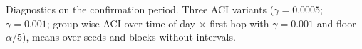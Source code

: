 \begin{table}[!htbp]
\centering
\caption{Diagnostics on the confirmation period. Three ACI variants ($\gamma=0.0005$; $\gamma=0.001$; group-wise ACI over time of
day $\times$ first hop with $\gamma=0.001$ and floor $\alpha/5$), means over
seeds and blocks without intervals.}
\label{tab:c2_diagnostics}
\footnotesize
{}
\end{table}
